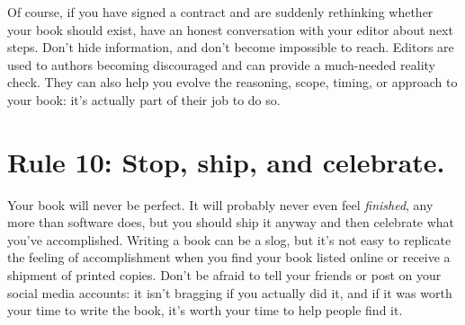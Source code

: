 \documentclass[10pt,letterpaper]{article}
\begin{document}
Of course, if you have signed a contract and are suddenly rethinking
whether your book should exist, have an honest conversation with your
editor about next steps. Don't hide information, and don't become
impossible to reach. Editors are used to authors becoming discouraged
and can provide a much-needed reality check. They can also help you
evolve the reasoning, scope, timing, or approach to your book: it's
actually part of their job to do so.

\section*{Rule 10: Stop, ship, and celebrate.}

Your book will never be perfect. It will probably never even feel
\emph{finished}, any more than software does, but you should ship it
anyway and then celebrate what you've accomplished. Writing a book can
be a slog, but it's not easy to replicate the feeling of accomplishment
when you find your book listed online or receive a shipment of printed
copies. Don't be afraid to tell your friends or post on your social
media accounts: it isn't bragging if you actually did it, and if it was
worth your time to write the book, it's worth your time to help people
find it.



\end{document}
